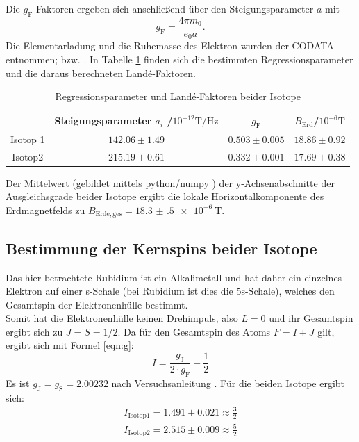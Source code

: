 Die $g_{\mathrm{F}}$-Faktoren ergeben sich anschließend über den Steigungsparameter $a$ mit
\begin{equation*}
  g_{\mathrm{F}}=\frac{4\pi m_0}{e_0 a}\mathrm{.}
\end{equation*}
Die Elementarladung und die Ruhemasse des Elektron wurden der CODATA entnommen; \cite{e} bzw. \cite{m_0}.
In Tabelle \ref{tab:res1} finden sich die bestimmten Regressionsparameter und die daraus berechneten Landé-Faktoren.


\begin{table}
  \caption{Regressionsparameter und Landé-Faktoren beider Isotope}
  \label{tab:res1}
 \centering
 \begin{tabular}{cccc}
   \toprule
&Steigungsparameter $a_i$ /$ 10^{-12}\si{\tesla\per\hertz}$&$g_{\mathrm{F}}$&$B_{\mathrm{Erd}}$/$10^{-6}\si{\tesla}$\\
\midrule
Isotop 1&$142.06\pm1.49$&$0.503\pm0.005$&$18.86\pm0.92$\\
Isotop2&$215.19\pm0.61$&$0.332\pm0.001$ &$17.69\pm0.38$\\
\bottomrule
\end{tabular}
\end{table}
Der Mittelwert (gebildet mittels python/numpy \cite{numpy}) der y-Achsenabschnitte der Ausgleichsgrade beider Isotope ergibt die lokale Horizontalkomponente des Erdmagnetfelds zu $B_{\mathrm{Erde,ges}}=\SI{18.3(5)e-6}{\tesla}$.


\subsection{Bestimmung der Kernspins beider Isotope}
Das hier betrachtete Rubidium ist ein Alkalimetall und hat daher ein einzelnes Elektron auf einer s-Schale (bei Rubidium ist dies die 5s-Schale), welches den Gesamtspin der Elektronenhülle bestimmt.\\
Somit hat die Elektronenhülle keinen Drehimpuls, also $L=0$ und ihr Gesamtspin ergibt sich zu $J=S=1/2$. Da für den Gesamtspin des Atoms $F=I+J$ gilt, ergibt sich mit Formel \eqref{eqn:g}:
\begin{equation*}
I=\frac{g_{\mathrm{J}}}{2\cdot g_{\mathrm{F}}}-\frac{1}{2}
\end{equation*}
Es ist $g_{\mathrm{J}}=g_{\mathrm{S}}=2.00232$ nach Versuchsanleitung \cite{Anleitung}.
Für die beiden Isotope ergibt sich:
\begin{gather*}
  I_{\mathrm{Isotop 1}}=1.491\pm0.021\approx\frac{3}{2}\\
  I_{\mathrm{Isotop 2}}=2.515\pm0.009\approx\frac{5}{2}\\
\end{gather*}

